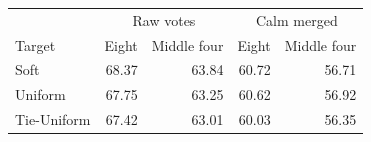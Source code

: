 \begin{tabular}{lrrrr}
\toprule
 & \multicolumn{2}{c}{Raw votes} & \multicolumn{2}{c}{Calm merged} \\
Target & Eight & Middle four & Eight & Middle four \\
\midrule
Soft & 68.37 & 63.84 & 60.72 & 56.71 \\
Uniform & 67.75 & 63.25 & 60.62 & 56.92 \\
Tie-Uniform & 67.42 & 63.01 & 60.03 & 56.35 \\
\bottomrule
\end{tabular}
